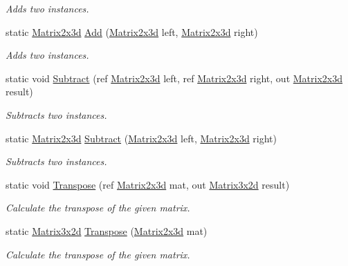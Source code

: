 \begin{DoxyCompactItemize}
\begin{DoxyCompactList}\small\item\em Adds two instances. \end{DoxyCompactList}\item 
static \hyperlink{struct_open_t_k_1_1_matrix2x3d}{Matrix2x3d} \hyperlink{struct_open_t_k_1_1_matrix2x3d_a2ca1ea9e7b29fefcbf657215534c33ff}{Add} (\hyperlink{struct_open_t_k_1_1_matrix2x3d}{Matrix2x3d} left, \hyperlink{struct_open_t_k_1_1_matrix2x3d}{Matrix2x3d} right)
\begin{DoxyCompactList}\small\item\em Adds two instances. \end{DoxyCompactList}\item 
static void \hyperlink{struct_open_t_k_1_1_matrix2x3d_a20b7f00ba26aee1b97847e625b962c05}{Subtract} (ref \hyperlink{struct_open_t_k_1_1_matrix2x3d}{Matrix2x3d} left, ref \hyperlink{struct_open_t_k_1_1_matrix2x3d}{Matrix2x3d} right, out \hyperlink{struct_open_t_k_1_1_matrix2x3d}{Matrix2x3d} result)
\begin{DoxyCompactList}\small\item\em Subtracts two instances. \end{DoxyCompactList}\item 
static \hyperlink{struct_open_t_k_1_1_matrix2x3d}{Matrix2x3d} \hyperlink{struct_open_t_k_1_1_matrix2x3d_ab88842a8b882cf1e4cd7b6818df41b5a}{Subtract} (\hyperlink{struct_open_t_k_1_1_matrix2x3d}{Matrix2x3d} left, \hyperlink{struct_open_t_k_1_1_matrix2x3d}{Matrix2x3d} right)
\begin{DoxyCompactList}\small\item\em Subtracts two instances. \end{DoxyCompactList}\item 
static void \hyperlink{struct_open_t_k_1_1_matrix2x3d_a11927a075f323d76c956339df2d9b864}{Transpose} (ref \hyperlink{struct_open_t_k_1_1_matrix2x3d}{Matrix2x3d} mat, out \hyperlink{struct_open_t_k_1_1_matrix3x2d}{Matrix3x2d} result)
\begin{DoxyCompactList}\small\item\em Calculate the transpose of the given matrix. \end{DoxyCompactList}\item 
static \hyperlink{struct_open_t_k_1_1_matrix3x2d}{Matrix3x2d} \hyperlink{struct_open_t_k_1_1_matrix2x3d_ad0bb4e90883655e599128c2b634e2da4}{Transpose} (\hyperlink{struct_open_t_k_1_1_matrix2x3d}{Matrix2x3d} mat)
\begin{DoxyCompactList}\small\item\em Calculate the transpose of the given matrix. \end{DoxyCompactList}\item 

\end{DoxyCompactItemize}

